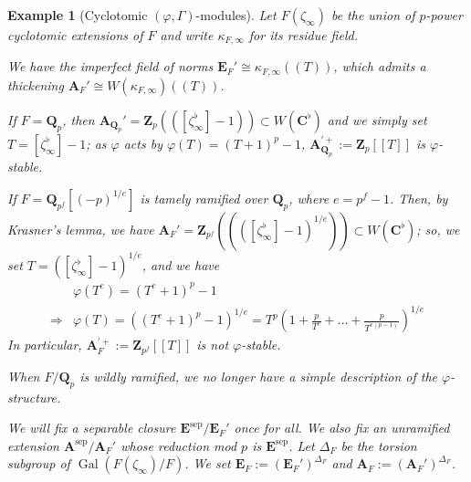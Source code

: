 \documentclass[11pt]{amsart}
\newtheorem{exam}{Example}
\numberwithin{thm}{section}
\numberwithin{lem}{section}
\numberwithin{cor}{section}
\numberwithin{prop}{section}
\numberwithin{exam}{section}
\numberwithin{dfn}{section}
\newcommand{\sep}{{\operatorname{sep}}}
\newcommand{\Gal}{\operatorname{Gal}}
\newcommand{\E}{\mathbf{E}}
\newcommand{\A}{\mathbf{A}}
\newcommand{\Z}{\mathbf{Z}}
\newcommand{\Q}{\mathbf{Q}}
\newcommand{\C}{\mathbf{C}}
\newcommand{\Qp}{\Q_p}
\begin{document}
\begin{exam}[Cyclotomic $(\varphi, \Gamma)$-modules]
\label{ex:cyc}
Let $F(\zeta_\infty)$
be the union of $p$-power cyclotomic extensions
of $F$
and write $\kappa_{F, \infty}$
for its residue field.

We have the imperfect field of norms
$\E_{F}'\cong \kappa_{F, \infty}(\!(T)\!)$,
which admits a thickening
$\A_F'\cong W(\kappa_{F,\infty})(\!(T)\!)$.

If $F=\Q_p$, then
$\A_{\Qp}'=\Z_p(\!( [\zeta_\infty^\flat]-1 )\!)
\subset W(\C^\flat)$
and
we simply set $T = [\zeta_\infty^\flat]-1$;
as
$\varphi$ acts by $\varphi(T) = (T+1)^p-1$,
$\A_{\Q_p}^{\prime+}:=\Z_p[\![T]\!]$
is $\varphi$-stable.

If $F=\Q_{p^f}[(-p)^{1/e}]$
is tamely ramified over $\Q_p$,
where $e=p^f-1$.
Then, by Krasner's lemma, we 
have 
$\A_{F}'=\Z_{p^f}(\!( ([\zeta_\infty^\flat]-1)^{1/e} )\!)
\subset W(\C^\flat)$;
so, we set
$T = ([\zeta_\infty^\flat]-1)^{1/e}$,
and we have
\begin{align*}
&\varphi(T^e)= (T^e+1)^p-1
\\
\Rightarrow
&\varphi(T) = ((T^e+1)^p-1)^{1/e}
=T^p(1+\frac{p}{T^e}+\dots+\frac{p}{T^{e(p-1)}})^{1/e}
\end{align*}
In particular,
$\A_{F}^{\prime+}:=\Z_{p^f}[\![T]\!]$
is not $\varphi$-stable.

When $F/\Q_p$ is wildly ramified,
we no longer have a simple description
of the $\varphi$-structure.

We will fix a separable closure
$\E^{\sep}/\E_F'$ once for all.
We also fix an unramified extension
$\A^{\sep}/\A_F'$
whose reduction mod $p$
is $\E^\sep$.
Let $\Delta_F$ be the torsion subgroup of
$\Gal(F(\zeta_\infty)/F)$.
We set $\E_F:=(\E_F')^{\Delta_F}$
and $\A_F:=(\A_F')^{\Delta_F}$.
\end{exam}
\end{document}
